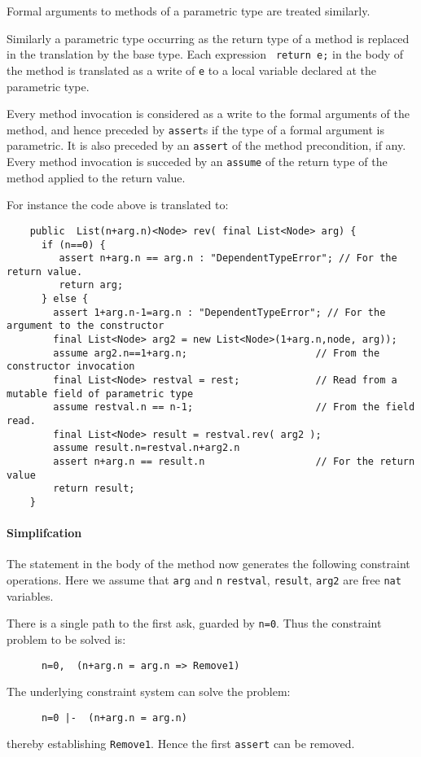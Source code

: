 \documentclass{article}
\begin{document}
Formal arguments to methods of a parametric type are treated similarly. 

Similarly a parametric type occurring as the return type of a method
is replaced in the translation by the base type. Each expression {\tt
return e;} in the body of the method is translated as a write of {\tt e} 
to a local variable declared at the parametric type.

Every method invocation is considered as a write to the formal
arguments of the method, and hence preceded by {\tt assert}s if the
type of a formal argument is parametric. It is also preceded by an
{\tt assert} of the method precondition, if any.  Every method
invocation is succeded by an {\tt assume} of the return type of the
method applied to the return value.

For instance the code above is translated to:
{\footnotesize
  \begin{verbatim}
    public  List(n+arg.n)<Node> rev( final List<Node> arg) {
      if (n==0) {
         assert n+arg.n == arg.n : "DependentTypeError"; // For the return value.
         return arg;
      } else {
        assert 1+arg.n-1=arg.n : "DependentTypeError"; // For the argument to the constructor
        final List<Node> arg2 = new List<Node>(1+arg.n,node, arg));
        assume arg2.n==1+arg.n;                      // From the constructor invocation
        final List<Node> restval = rest;             // Read from a mutable field of parametric type
        assume restval.n == n-1;                     // From the field read.
        final List<Node> result = restval.rev( arg2 );
        assume result.n=restval.n+arg2.n
        assert n+arg.n == result.n                   // For the return value
        return result;
    }
  \end{verbatim}}

\paragraph{Simplifcation}
The statement in the body of the method now generates the following
constraint operations. Here we assume that {\tt arg} and {\tt n}
{\tt restval}, {\tt result}, {\tt arg2} are free {\tt nat} variables.

There is a single path to the first ask, guarded by {\tt n=0}. Thus the constraint problem
to be solved is:
{\footnotesize
  \begin{verbatim}
      n=0,  (n+arg.n = arg.n => Remove1)
\end{verbatim}}
\noindent The underlying constraint system can solve the problem:
{\footnotesize
  \begin{verbatim}
      n=0 |-  (n+arg.n = arg.n)
\end{verbatim}}
\noindent thereby establishing {\tt Remove1}. Hence the first {\tt assert} can be removed.
\end{document}
